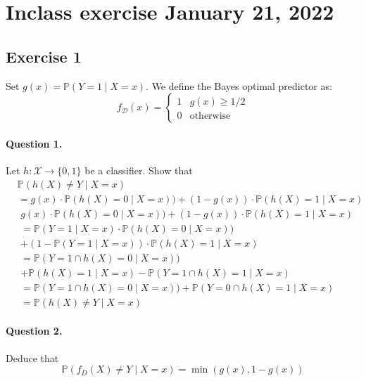 \documentclass{article}
\renewcommand{\P}{\mathbb{P}}
\begin{document}
\section{Inclass exercise January 21, 2022}
\subsection{Exercise 1}
Set \(g(x) = \P(Y=1 \mid X=x)\). We define the Bayes optimal predictor as:
\begin{equation*}
  f_\mathcal{D}(x) =
  \begin{cases}
    1 & g(x) \geq 1/2    \\
    0 & \text{otherwise}
  \end{cases}
\end{equation*}

\paragraph{Question 1.}
Let \(h: \mathcal{X} \to \{0,1\}\) be a classifier. Show that
\begin{align*}
   & \P(h(X) \neq Y \mid X = x )                                                      \\
   & = g(x) \cdot \P(h(X) = 0 \mid X = x)) + (1 - g(x)) \cdot \P(h(X) = 1 \mid X = x)
\end{align*}
\begin{align*}
   & g(x) \cdot \P(h(X) = 0 \mid X = x)) + (1 - g(x)) \cdot \P(h(X) = 1 \mid X = x) \\
   & = \P(Y=1 \mid X = x) \cdot \P(h(X) = 0 \mid X = x))                            \\
   & + (1 - \P(Y=1 \mid X = x)) \cdot \P(h(X) = 1 \mid X = x)                       \\
   & = \P(Y=1 \cap h(X) = 0 \mid X = x))                                            \\
   & + \P(h(X) = 1 \mid X = x) - \P(Y=1 \cap h(X) = 1 \mid X = x)                   \\
   & = \P(Y=1 \cap h(X) = 0 \mid X = x)) + \P(Y=0 \cap h(X) = 1 \mid X = x)         \\
   & =\P(h(X) \neq Y \mid X = x)
\end{align*}

\paragraph{Question 2.}
Deduce that
\[
  \P(f_D (X) \neq Y \mid X = x) = \min (g(x), 1 - g(x))
\]
\end{document}
